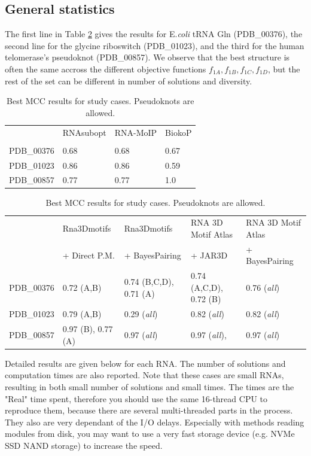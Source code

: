 \documentclass{article}
\begin{document}
\subsection{General statistics}

The first line in Table \ref{Tab:01} gives the results for E.\textit{coli} tRNA Gln  (PDB\_00376), the second line for the glycine riboswitch (PDB\_01023), and the third for the human telomerase's pseudoknot (PDB\_00857). We observe that the best structure is often the same accross the different objective functions $f_{1A}, f_{1B}, f_{1C}, f_{1D}$, but the rest of the set can be different in number of solutions and diversity.

\begin{table}[h]
\caption{Best MCC results for study cases. Pseudoknots are allowed. \label{Tab:01}}
\vspace{5mm}
\begin{tabular}{@{}r|lll|@{}} & RNAsubopt & RNA-MoIP & BiokoP \\
 & & & \\\hline
PDB\_00376 & 0.68 & 0.68 & 0.67 \\
PDB\_01023 & 0.86 & 0.86 & 0.59 \\
PDB\_00857 & 0.77 & 0.77 & 1.0 \\
\end{tabular}
\vspace{5mm}
\vfill

\begin{tabular}{@{}r|llll|@{}} &  Rna3Dmotifs & Rna3Dmotifs & RNA 3D Motif Atlas & RNA 3D Motif Atlas\\
 & + Direct P.M. & + BayesPairing & + JAR3D & + BayesPairing \\\hline
PDB\_00376 &  0.72 (A,B) & 0.74 (B,C,D), 0.71 (A) & 0.74 (A,C,D), 0.72 (B) & 0.76 (\textit{all})\\
PDB\_01023 &  0.79 (A,B) & 0.29 (\textit{all}) & 0.82 (\textit{all}) & 0.82 (\textit{all})\\
PDB\_00857 &  0.97 (B), 0.77 (A) & 0.97 (\textit{all}) & 0.97 (\textit{all}), & 0.97 (\textit{all})\\
\end{tabular}
\end{table}

Detailed results are given below for each RNA. The number of solutions and computation times are also reported. Note that these cases are small RNAs, resulting in both small number of solutions and small times. The times are the "Real" time spent, therefore you should use the same 16-thread CPU to reproduce them, because there are several multi-threaded parts in the process. They also are very dependant of the I/O delays. Especially with methods reading modules from disk, you may want to use a very fast storage device (e.g. NVMe SSD NAND storage) to increase the speed.
\end{document}
